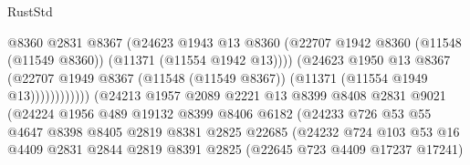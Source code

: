 \begin{lexlean}{RustStd}
\begin{coremodule}
                                          @8360
                                          @2831
                                          @8367
                                          (@24623
                                            @1943
                                            @13
                                            @8360
                                            (@22707
                                              @1942
                                              @8360
                                              (@11548 (@11549 @8360))
                                              (@11371 (@11554 @1942 @13))))
                                          (@24623
                                            @1950
                                            @13
                                            @8367
                                            (@22707
                                              @1949
                                              @8367
                                              (@11548 (@11549 @8367))
                                              (@11371 (@11554 @1949 @13))))))))))))
                          (@24213
                            @1957
                            @2089
                            @2221
                            @13
                            @8399
                            @8408
                            @2831
                            @9021
                            (@24224
                              @1956
                              @489
                              @19132
                              @8399
                              @8406
                              @6182
                              (@24233
                                @726
                                @53
                                @55
                                @4647
                                @8398
                                @8405
                                @2819
                                @8381
                                @2825
                                @22685
                                (@24232
                                  @724
                                  @103
                                  @53
                                  @16
                                  @4409
                                  @2831
                                  @2844
                                  @2819
                                  @8391
                                  @2825
                                  (@22645 @723 @4409 @17237 @17241)

\end{coremodule}
\end{lexlean}
